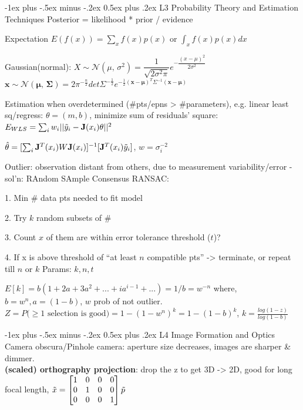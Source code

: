 \documentclass[10pt,landscape]{article}
\makeatletter
\renewcommand{\section}{\@startsection{section}{1}{0mm}%
                                {-1ex plus -.5ex minus -.2ex}%
                                {0.5ex plus .2ex}%
                                {\normalfont\large\bfseries}}
\makeatother
\begin{document}
\begin{multicols}{3}
\section{L3 Probability Theory and Estimation Techniques}
Posterior = likelihood * prior / evidence

Expectation $E(f(x)) = \sum_xf(x)p(x)$ or $\int_x f(x)p(x)dx$

Gaussian(normal): $X \sim \mathcal{N}(\mu,\,\sigma^{2}) = \dfrac{1}{\sqrt{2\sigma^2\pi}}e^{-\dfrac{(x-\mu)^2}{2\sigma^2}}$
$\mathbf{x}\sim \mathcal{N}(\mathbf{\mu},\,\mathbf{\Sigma}) = 2\pi^{-\frac{n}{2}}det\Sigma^{-\frac{1}{2}}e^{-\frac{1}{2}(\mathbf{x} - \mathbf{\mu})^T\Sigma^{-1}(\mathbf{x} - \mathbf{\mu})}$

Estimation when overdetermined (\#pts/epns > \#parameters), e.g.  linear least sq/regress: $\theta =(m,b)$, minimize sum of residuals’ square: $E_{WLS} = \sum_i w_i||\Tilde{y}_i - \mathbf{J}(x_i)\mathbf{\theta}||^2$

$\hat{\theta} = [\sum_i \mathbf{J}^T(x_i)W\mathbf{J}(x_i)]^{-1}[\mathbf{J}^T(x_i)\Tilde{y}_i]$, $w=\sigma_i^{-2}$

Outlier: observation distant from others, due to measurement variability/error - sol’n: RAndom SAmple Consensus RANSAC:

1. Min \# data pts needed to fit model\par
2. Try $k$ random subsets  of \# \par
3. Count $x$ of them are within error tolerance threshold ($t$)?\par
4. If x is above threshold of “at least $n$ compatible pts” -> terminate, or repeat till $n$ or $k$
Params: $k, n, t$

$E[k] = b(1 + 2a + 3a^2 + ... + ia^{i-1}+...) = 1/b = w^{-n}$ where, $b = w^n, a = (1-b)$, $w$ prob of not outlier.
$Z = P{\text{(}\geq \text{1 selection is good})=1- (1-w^n)^k = 1 - (1-b)^k}$, $k=\frac{log(1-z)}{log(1-b)}$

\section{L4 Image Formation and Optics}
Camera obscura/Pinhole camera: aperture size decreases, images are sharper \& dimmer.\\
\textbf{(scaled) orthography projection}: drop the z to get 3D -> 2D, good for long focal length, $\Tilde{x} = \begin{bmatrix} 1 & 0 & 0 & 0 \\ 0 & 1 & 0 & 0 \\ 0 & 0 & 0 & 1\end{bmatrix}\Tilde{p}$


\end{multicols}
\end{document}
